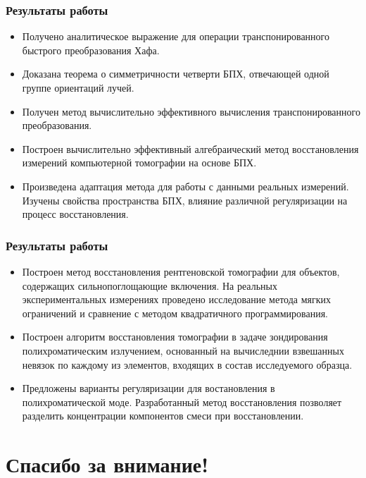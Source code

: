 \documentclass[12pt]{beamer}
\begin{document}
\begin{frame}
\frametitle{Результаты работы}
\begin{itemize}
  \item Получено аналитическое выражение для операции транспонированного быстрого преобразования Хафа. 
  \item Доказана теорема о симметричности четверти БПХ, отвечающей одной группе ориентаций лучей. 
  \item Получен метод вычислительно эффективного вычисления транспонированного преобразования.
  \item Построен вычислительно эффективный алгебраический метод восстановления измерений компьютерной томографии на основе БПХ.
  \item Произведена адаптация метода для работы с данными реальных измерений. Изучены свойства пространства БПХ, влияние различной регуляризации на процесс восстановления.
\end{itemize}
\end{frame}

\begin{frame}
\frametitle{Результаты работы}
\begin{itemize}
  \item Построен метод восстановления рентгеновской томографии для объектов, содержащих сильнопоглощающие включения. На реальных экспериментальных измерениях проведено исследование метода мягких ограничений и сравнение с методом квадратичного программирования.
  \item Построен алгоритм восстановления томографии в задаче зондирования полихроматическим излучением, основанный на вычиследнии взвешанных невязок по каждому из элементов, входящих в состав исследуемого образца. 
  \item Предложены варианты регуляризации для востановления в полихроматической моде. Разработанный метод восстановления позволяет разделить концентрации компонентов смеси при восстановлении.
\end{itemize}
\end{frame}

\section{Спасибо за внимание!}
\end{document}
